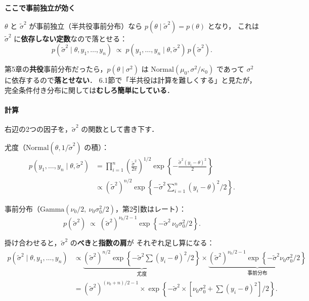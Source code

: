 \documentclass[lualatex,ja=standard,a4paper,12pt]{bxjsarticle}
\begin{document}
\begin{pointbox}
\textbf{ここで事前独立が効く}

$\theta$ と $\tilde{\sigma}^2$ が事前独立（半共役事前分布）なら
$p(\theta \mid \tilde{\sigma}^2) = p(\theta)$ となり，
これは $\tilde{\sigma}^2$ に\textbf{依存しない定数}なので落とせる：
\[
  p(\tilde{\sigma}^2 \mid \theta, y_1, \ldots, y_n)
  \;\propto\; p(y_1, \ldots, y_n \mid \theta, \tilde{\sigma}^2)\, p(\tilde{\sigma}^2).
\]

\medskip
第5章の\textbf{共役}事前分布だったら，$p(\theta \mid \sigma^2)$ は
$\mathrm{Normal}(\mu_0, \sigma^2/\kappa_0)$ であって
$\sigma^2$ に依存するので\textbf{落とせない}．
6.1節で「半共役は計算を難しくする」と見たが，
完全条件付き分布に関しては\textbf{むしろ簡単にしている}．
\end{pointbox}

\paragraph{計算}
右辺の2つの因子を，$\tilde{\sigma}^2$ の関数として書き下す．

\medskip
\noindent 尤度（$\mathrm{Normal}(\theta, 1/\tilde{\sigma}^2)$ の積）：
\begin{align*}
  p(y_1, \ldots, y_n \mid \theta, \tilde{\sigma}^2)
  &= \prod_{i=1}^{n} \left(\frac{\tilde{\sigma}^2}{2\pi}\right)^{1/2}
    \exp\!\left\{-\frac{\tilde{\sigma}^2 (y_i - \theta)^2}{2}\right\} \\[4pt]
  &\propto (\tilde{\sigma}^2)^{n/2}
    \exp\!\left\{-\tilde{\sigma}^2 \sum_{i=1}^{n}(y_i - \theta)^2 \big/ 2\right\}.
\end{align*}

\noindent 事前分布（$\mathrm{Gamma}(\nu_0/2,\ \nu_0\sigma_0^2/2)$，第2引数はレート）：
\[
  p(\tilde{\sigma}^2)
  \;\propto\; (\tilde{\sigma}^2)^{\nu_0/2 - 1}
    \exp\!\left\{-\tilde{\sigma}^2\, \nu_0\sigma_0^2 / 2\right\}.
\]

\noindent 掛け合わせると，$\tilde{\sigma}^2$ の\textbf{べき}と\textbf{指数の肩}が
それぞれ足し算になる：
\begin{align*}
  p(\tilde{\sigma}^2 \mid \theta, y_1, \ldots, y_n)
  &\propto \underbrace{(\tilde{\sigma}^2)^{n/2}
     \exp\!\left\{-\tilde{\sigma}^2 \textstyle\sum (y_i - \theta)^2 / 2\right\}}_{\text{尤度}}
   \times \underbrace{(\tilde{\sigma}^2)^{\nu_0/2 - 1}
     \exp\!\left\{-\tilde{\sigma}^2 \nu_0\sigma_0^2 / 2\right\}}_{\text{事前分布}} \\[6pt]
  &= (\tilde{\sigma}^2)^{(\nu_0 + n)/2 - 1}
    \times \exp\!\left\{-\tilde{\sigma}^2
      \times \left[\nu_0\sigma_0^2 + \textstyle\sum (y_i - \theta)^2\right] \big/ 2 \right\}.
\end{align*}
\end{document}
